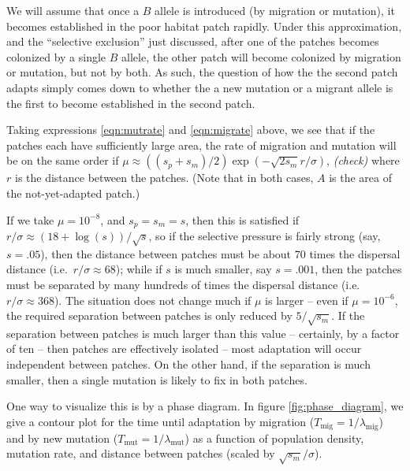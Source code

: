 \documentclass{article}
\newcommand{\migrate}{\lambda_\text{mig}}
\newcommand{\mutrate}{\lambda_\text{mut}}
\newcommand{\Tmig}{T_\text{mig}}
\newcommand{\Tmut}{T_\text{mut}}
\newcommand{\plr}[1]{{\it\color{blue}(#1)}}
\begin{document}
We will assume that once a $B$ allele is introduced (by migration or mutation), 
it becomes established in the poor habitat patch rapidly. 
Under this approximation, and the ``selective exclusion'' just discussed,
after one of the patches becomes colonized by a single $B$ allele, 
the other patch will become colonized by migration or mutation, but not by both. 
As such, the question of how the the second patch adapts
simply comes down to whether the a new mutation or a migrant allele is the first to become established in the second patch. 

Taking expressions \eqref{eqn:mutrate} and \eqref{eqn:migrate} above,
we see that if the patches each have sufficiently large area,
the rate of migration and mutation will be on the same order if 
$\mu \approx ((s_p+s_m)/2) \exp(-\sqrt{2 s_m} r / \sigma)$,
\plr{check}
where $r$ is the distance between the patches.
(Note that in both cases, $A$ is the area of the not-yet-adapted patch.)

If we take $\mu = 10^{-8}$, and $s_p=s_m=s$, then this is satisfied if $r/\sigma \approx (18+\log(s))/\sqrt{s}$,
so if the selective pressure is fairly strong (say, $s=.05$),
then the distance between patches must be about 70 times the dispersal distance (i.e.\ $r/\sigma \approx 68$);
while if $s$ is much smaller, say $s = .001$, 
then the patches must be separated by many hundreds of times the dispersal distance (i.e.\ $r/\sigma \approx 368$).
The situation does not change much if $\mu$ is larger -- even if $\mu = 10^{-6}$, 
the required separation between patches is only reduced by $5/\sqrt{s_m}$.
If the separation between patches is much larger than this value -- certainly, by a factor of ten -- 
then patches are effectively isolated -- most adaptation will occur independent between patches.
On the other hand, if the separation is much smaller, then a single
mutation is likely to fix in both patches.

One way to visualize this is by a phase diagram.
In figure \ref{fig:phase_diagram},
we give a contour plot for the time until adaptation by migration ($\Tmig = 1/\migrate$) and by new mutation ($\Tmut=1/\mutrate$)
as a function of population density, mutation rate, and distance between patches (scaled by $\sqrt{s_m}/\sigma$).
\end{document}
